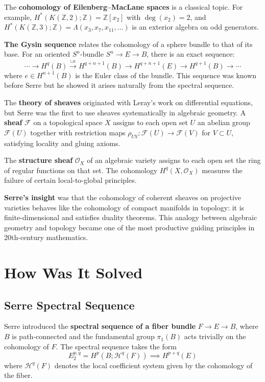 The \textbf{cohomology of Eilenberg--MacLane spaces} is a classical topic. For example, $H^*(K(\mathbb{Z}, 2); \mathbb{Z}) = \mathbb{Z}[x_2]$ with $\deg(x_2) = 2$, and $H^*(K(\mathbb{Z}, 3); \mathbb{Z}) = \Lambda(x_3, x_7, x_{11}, \ldots)$ is an exterior algebra on odd generators.

\textbf{The Gysin sequence} relates the cohomology of a sphere bundle to that of its base. For an oriented $S^n$-bundle $S^n \to E \to B$, there is an exact sequence:
\[ \cdots \to H^q(B) \xrightarrow{\cup e} H^{q+n+1}(B) \to H^{q+n+1}(E) \to H^{q+1}(B) \to \cdots \]
where $e \in H^{n+1}(B)$ is the Euler class of the bundle. This sequence was known before Serre but he showed it arises naturally from the spectral sequence.

The \textbf{theory of sheaves} originated with Leray's work on differential equations, but Serre was the first to use sheaves systematically in algebraic geometry. A \textbf{sheaf} $\mathcal{F}$ on a topological space $X$ assigns to each open set $U$ an abelian group $\mathcal{F}(U)$ together with restriction maps $\rho_{UV}: \mathcal{F}(U) \to \mathcal{F}(V)$ for $V \subset U$, satisfying locality and gluing axioms.

The \textbf{structure sheaf} $\mathcal{O}_X$ of an algebraic variety assigns to each open set the ring of regular functions on that set. The cohomology $H^q(X, \mathcal{O}_X)$ measures the failure of certain local-to-global principles.

\textbf{Serre's insight} was that the cohomology of coherent sheaves on projective varieties behaves like the cohomology of compact manifolds in topology: it is finite-dimensional and satisfies duality theorems. This analogy between algebraic geometry and topology became one of the most productive guiding principles in 20th-century mathematics.

\section{How Was It Solved}

\subsection{Serre Spectral Sequence}

Serre introduced the \textbf{spectral sequence of a fiber bundle} $F \to E \to B$, where $B$ is path-connected and the fundamental group $\pi_1(B)$ acts trivially on the cohomology of $F$. The spectral sequence takes the form
\[E_2^{p,q} = H^p(B; \mathcal{H}^q(F)) \implies H^{p+q}(E)\]
where $\mathcal{H}^q(F)$ denotes the local coefficient system given by the cohomology of the fiber.

